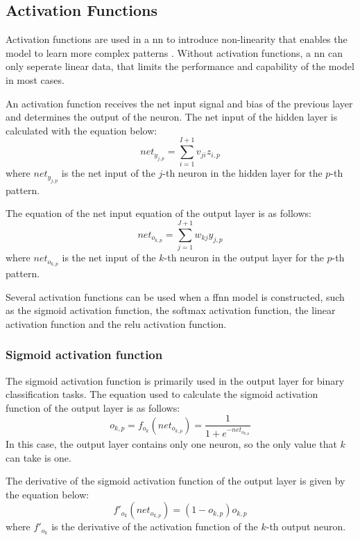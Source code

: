 \documentclass[10pt, conference]{IEEEtran}
\begin{document}
\subsection{Activation Functions} \label{section: Act_Func_background}

Activation functions are used in a \acrfull{nn} to introduce non-linearity that enables the model to learn more
complex patterns \cite{activation_function_ref}. Without activation functions, a \acrshort{nn} can only seperate
linear data, that limits the performance and capability of the model in most cases.

An activation function receives the net input signal and bias of the previous layer and determines the output
of the neuron. The net input of the hidden layer is calculated with the equation below:
\begin{equation}
    net_{y_{j,p}} = \sum_{i=1}^{I+1} v_{ji} z_{i,p} \label{eq: net_hidden}
\end{equation}
where $net_{y_{j,p}}$ is the net input of the $j$-th neuron in the hidden layer for the $p$-th pattern.

The equation of the net input equation of the output layer is as follows:
\begin{equation}
    net_{o_{k,p}} = \sum_{j=1}^{J+1} w_{kj} y_{j,p} \label{eq: net_output}
\end{equation}
where $net_{o_{k,p}}$ is the net input of the $k$-th neuron in the output layer for the $p$-th pattern.

Several activation functions can be used when a \acrshort{ffnn} model is constructed, such as the sigmoid activation
function, the softmax activation function, the linear activation function and the \acrfull{relu} activation function.

\subsubsection{Sigmoid activation function}
The sigmoid activation function is primarily used in the output layer for binary classification tasks.
The equation used to calculate the sigmoid activation function of the output layer is as follows:
\begin{equation}
    o_{k,p} = f_{o_k}(net_{o_{k,p}}) = \frac{1}{1 + e^{-net_{o_{k,p}}}} \label{eq: sigmoid_activation}
\end{equation}
In this case, the output layer contains only one neuron, so the only value that $k$ can take is one.

The derivative of the sigmoid activation function of the output layer is given by the equation below:
\begin{equation}
    f'_{o_k}(net_{o_{k,p}}) = (1-o_{k,p})o_{k,p} \label{eq: sigmoid_activation_derivative}
\end{equation}
where $f'_{o_k}$ is the derivative of the activation function of the $k$-th output neuron.
\end{document}
